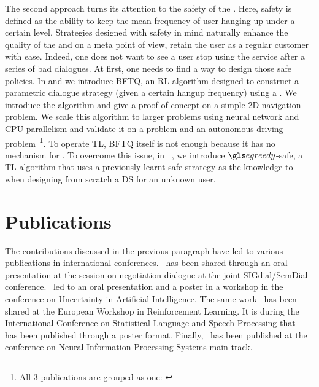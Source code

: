 The second approach turns its attention to the safety of the . Here, safety is defined as the ability to keep the mean frequency of user hanging up under a certain level. Strategies designed with safety in mind naturally enhance the quality of the  and on a meta point of view, retain the user as a regular customer with ease. Indeed, one does not want to see a user stop using the service after a series of bad dialogues. At first, one needs to find a way to design those safe policies. In \textcite{carrara2018fitted} and \textcite{carrara2018fitted2} we introduce \gls{BFTQ}, an \gls{RL} algorithm designed to construct a parametric dialogue strategy (given a certain hangup frequency) using a . We introduce the algorithm and give a proof of concept on a simple 2D navigation problem. We scale this algorithm to larger problems using neural network and \gls{CPU} parallelism and validate it on a  problem and an autonomous driving problem~\parencite{carrara2019scaling}\footnote{All 3 publications are grouped as one: \textcite{carraraall}}. To operate \gls{TL}, \gls{BFTQ} itself is not enough because it has no mechanism for . To overcome this issue, in ~\textcite{carrara2018safe}, we introduce $\egreedy$-safe, a \gls{TL} algorithm that uses a previously learnt safe strategy as the knowledge to  when designing from scratch a \gls{DS} for an unknown user.

\section{Publications}

The contributions discussed in the previous paragraph have led to various publications in international conferences.~\textcite{carrara2017online} has been shared through an oral presentation at the session on negotiation dialogue at the joint SIGdial/SemDial conference.~\textcite{carrara2018fitted} led to an oral presentation and a poster in a workshop in the conference on Uncertainty in Artificial Intelligence. The same work~\parencite{carrara2018fitted2} has been shared at the European Workshop in Reinforcement Learning. It is during the International Conference on Statistical Language and Speech Processing that~\textcite{carrara2018safe} has been published through a poster format. Finally,~\textcite{carrara2019scaling} has been published at the conference on Neural Information Processing Systems main track.

